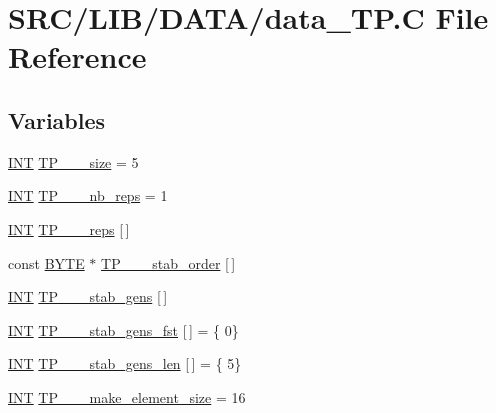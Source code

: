 \hypertarget{data___t_p_8_c}{}\section{S\+R\+C/\+L\+I\+B/\+D\+A\+T\+A/data\+\_\+\+TP.C File Reference}
\label{data___t_p_8_c}
\subsection*{Variables}
\begin{DoxyCompactItemize}
\item 
\mbox{\hyperlink{galois_8h_a09fddde158a3a20bd2dcadb609de11dc}{I\+NT}} \mbox{\hyperlink{data___t_p_8_c_a4629d2938acdbdabfc38f102bde08029}{T\+P\+\_\+\_\+\_\+size}} = 5
\item 
\mbox{\hyperlink{galois_8h_a09fddde158a3a20bd2dcadb609de11dc}{I\+NT}} \mbox{\hyperlink{data___t_p_8_c_ad47344e6eb9f88de6f6f38f282e1b224}{T\+P\+\_\+\_\+\_\+nb\+\_\+reps}} = 1
\item 
\mbox{\hyperlink{galois_8h_a09fddde158a3a20bd2dcadb609de11dc}{I\+NT}} \mbox{\hyperlink{data___t_p_8_c_a1c16ca8ced8fc3396c0d6d200f3f454e}{T\+P\+\_\+\_\+\_\+reps}} \mbox{[}$\,$\mbox{]}
\item 
const \mbox{\hyperlink{galois_8h_ab6cc7b4aeb6ea31aba2b3fbfc83ff5e6}{B\+Y\+TE}} $\ast$ \mbox{\hyperlink{data___t_p_8_c_ac0071140d6dfbae6b1006efc3f3531b5}{T\+P\+\_\+\_\+\_\+stab\+\_\+order}} \mbox{[}$\,$\mbox{]}
\item 
\mbox{\hyperlink{galois_8h_a09fddde158a3a20bd2dcadb609de11dc}{I\+NT}} \mbox{\hyperlink{data___t_p_8_c_afb87a7cda11196047b1b7b71cb6171dd}{T\+P\+\_\+\_\+\_\+stab\+\_\+gens}} \mbox{[}$\,$\mbox{]}
\item 
\mbox{\hyperlink{galois_8h_a09fddde158a3a20bd2dcadb609de11dc}{I\+NT}} \mbox{\hyperlink{data___t_p_8_c_ab4843e9a89c7cf8e59b795929970ef6c}{T\+P\+\_\+\_\+\_\+stab\+\_\+gens\+\_\+fst}} \mbox{[}$\,$\mbox{]} = \{ 0\}
\item 
\mbox{\hyperlink{galois_8h_a09fddde158a3a20bd2dcadb609de11dc}{I\+NT}} \mbox{\hyperlink{data___t_p_8_c_a23057244dd993295cd3f2ef52cad9c96}{T\+P\+\_\+\_\+\_\+stab\+\_\+gens\+\_\+len}} \mbox{[}$\,$\mbox{]} = \{ 5\}
\item 
\mbox{\hyperlink{galois_8h_a09fddde158a3a20bd2dcadb609de11dc}{I\+NT}} \mbox{\hyperlink{data___t_p_8_c_aaf090b097442268f42fb61ad012082e3}{T\+P\+\_\+\_\+\_\+make\+\_\+element\+\_\+size}} = 16

\end{DoxyCompactItemize}
